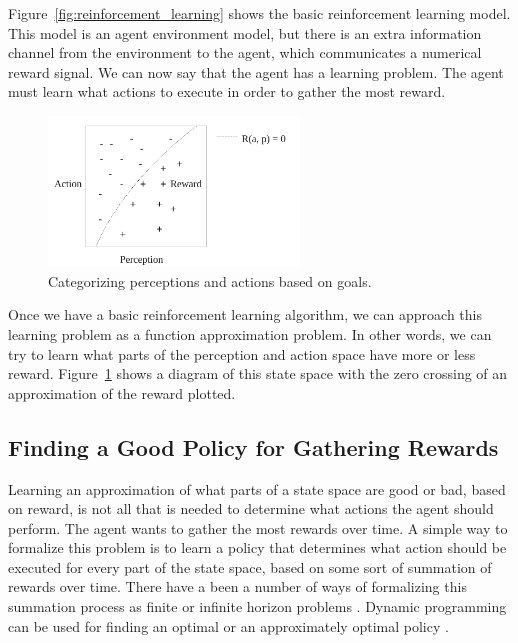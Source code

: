 Figure~\ref{fig:reinforcement_learning} shows the basic reinforcement
learning model.  This model is an agent environment model, but there
is an extra information channel from the environment to the agent,
which communicates a numerical reward signal.  We can now say that the
agent has a learning problem.  The agent must learn what actions to
execute in order to gather the most reward.

\begin{figure}[bth]
  \center
  \includegraphics[height=4cm]{gfx/perception_categorization}
  \caption[Categorizing perceptions and actions based on goals]{Categorizing perceptions and actions based on goals.}
  \label{fig:perception_categorization}
\end{figure}

Once we have a basic reinforcement learning algorithm, we can approach
this learning problem as a function approximation problem.  In other
words, we can try to learn what parts of the perception and action
space have more or less reward.
Figure~\ref{fig:perception_categorization} shows a diagram of this
state space with the zero crossing of an approximation of the reward
plotted.

\subsection{Finding a Good Policy for Gathering Rewards}

Learning an approximation of what parts of a state space are good or
bad, based on reward, is not all that is needed to determine what
actions the agent should perform.  The agent wants to gather the most
rewards over time.  A simple way to formalize this problem is to learn
a policy that determines what action should be executed for every part
of the state space, based on some sort of summation of rewards over
time.  There have a been a number of ways of formalizing this
summation process as finite or infinite horizon problems
\citep{sutton:1998}.  Dynamic programming can be used for finding an
optimal or an approximately optimal policy \citep{bertsekas:1995}.

